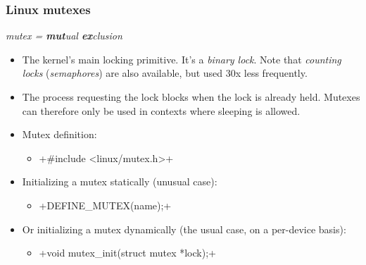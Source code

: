 \begin{frame}[fragile]
  \frametitle{Linux mutexes}
  {\em mutex = {\bf mut}ual {\bf ex}clusion}
  \begin{itemize}
  \item The kernel's main locking primitive. It's a {\em binary lock}.
    Note that {\em counting locks} ({\em semaphores}) are also available,
    but used 30x less frequently.
  \item The process requesting the lock blocks when the lock is
    already held.  Mutexes can therefore only be used in contexts
    where sleeping is allowed.
  \item Mutex definition:
    \begin{itemize}
    \item {}+#include <linux/mutex.h>+
    \end{itemize}
  \item Initializing a mutex statically (unusual case):
    \begin{itemize}
    \item {}+DEFINE_MUTEX(name);+
    \end{itemize}
  \item Or initializing a mutex dynamically (the usual case, on a per-device basis):
    \begin{itemize}
    \item {}+void mutex_init(struct mutex *lock);+
    \end{itemize}
  \end{itemize}
\end{frame}

